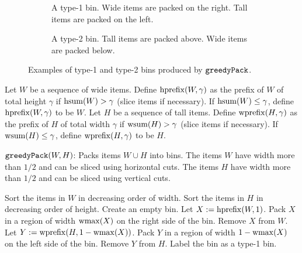 \begin{figure}[!ht]
\begin{subfigure}{0.45\textwidth}
    \centering
    
    \caption{A type-1 bin. Wide items are packed on the right. Tall items are packed on the left.}%
\label{fig:greedy-pack:1}
\end{subfigure}
\hfil
\begin{subfigure}{0.45\textwidth}
    \centering
    
    \caption{A type-2 bin. Tall items are packed above. Wide items are packed below.}%
\label{fig:greedy-pack:2}
\end{subfigure}
\caption{Examples of type-1 and type-2 bins produced by $\operatorname{\mathtt{greedyPack}}$.}
\label{fig:greedy-pack}
\end{figure}

\begin{definition}
\label{defn:hw-prefix}
Let $W$ be a sequence of wide items.
Define $\operatorname{hprefix}(W, \gamma)$ as the prefix of $W$ of total height $\gamma$
if $\operatorname{hsum}(W) > \gamma$ (slice items if necessary).
If $\operatorname{hsum}(W) \le \gamma$, define $\operatorname{hprefix}(W, \gamma)$ to be $W$.
Let $H$ be a sequence of tall items.
Define $\operatorname{wprefix}(H, \gamma)$ as the prefix of $H$ of total width $\gamma$
if $\operatorname{wsum}(H) > \gamma$ (slice items if necessary).
If $\operatorname{wsum}(H) \le \gamma$, define $\operatorname{wprefix}(H, \gamma)$ to be $H$.
\end{definition}

\begin{algorithm}[!ht]
\caption{$\operatorname{\mathtt{greedyPack}}(W, H)$: Packs items $W \cup H$ into bins.
The items $W$ have width more than $1/2$ and can be sliced using horizontal cuts.
The items $H$ have width more than $1/2$ and can be sliced using vertical cuts.}
\label{algo:greedyPack}
\begin{algorithmic}[1]
\State Sort the items in $W$ in decreasing order of width.
\State Sort the items in $H$ in decreasing order of height.
    \State Create an empty bin.
        \State Let $X := \operatorname{hprefix}(W, 1)$. 
        \State Pack $X$ in a region of width $\operatorname{wmax}(X)$ on the right side of the bin.
        \State Remove $X$ from $W$.
        \State Let $Y := \operatorname{wprefix}(H, 1-\operatorname{wmax}(X))$. 
        \State Pack $Y$ in a region of width $1 - \operatorname{wmax}(X)$ on the left side of the bin.
        \State Remove $Y$ from $H$.
        \State Label the bin as a type-1 bin.
    \Else
    \EndIf
\EndWhile
\end{algorithmic}
\end{algorithm}

